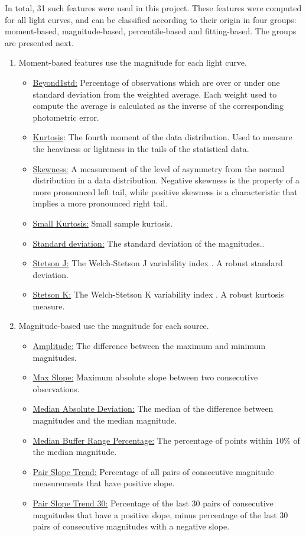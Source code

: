 In total, 31 such features were used in this project. These features were computed for all light curves, and can be classified according to their origin in four groups: moment-based, magnitude-based, percentile-based and fitting-based. The groups are presented next.

\begin{enumerate}
    
    \item Moment-based features use the magnitude for each light curve.
    \begin{itemize}
        \item \underline{Beyond1std:} Percentage of observations which are over or under one standard deviation from the weighted average. Each weight used to compute the average is calculated as the inverse of the corresponding photometric error.
        \item \underline{Kurtosis}: The fourth moment of the data distribution. Used to measure the heaviness or lightness in the tails of the statistical data.
        \item \underline{Skewness:} A measurement of the level of asymmetry from the normal distribution in a data distribution. Negative skewness is the property of a more pronounced left tail, while positive skewness is a characteristic that implies a more pronounced right tail.
        \item \underline{Small Kurtosis:} Small sample kurtosis.
        \item \underline{Standard deviation:} The standard deviation of the magnitudes..
        \item \underline{Stetson J:} The Welch-Stetson J variability index \cite{1996PASP..108..851S}. A robust standard deviation.
        \item \underline{Stetson K:} The Welch-Stetson K variability index \cite{1996PASP..108..851S}. A robust kurtosis measure.
    \end{itemize}
    
    \item Magnitude-based use the magnitude for each source.
    \begin{itemize}
        \item \underline{Amplitude:} The difference between the maximum and minimum magnitudes.
        \item \underline{Max Slope:} Maximum absolute slope between two consecutive observations.
        \item \underline{Median Absolute Deviation:} The median of the difference between magnitudes and the median magnitude.
        \item \underline{Median Buffer Range Percentage:} The percentage of points within 10\% of the median magnitude.
        \item \underline{Pair Slope Trend:} Percentage of all pairs of consecutive magnitude measurements that have positive slope.
        \item \underline{Pair Slope Trend 30:} Percentage of the last 30 pairs of consecutive magnitudes that have a positive slope, minus percentage of the last 30 pairs of consecutive magnitudes with a negative slope.
    \end{itemize}
    

\end{enumerate}
